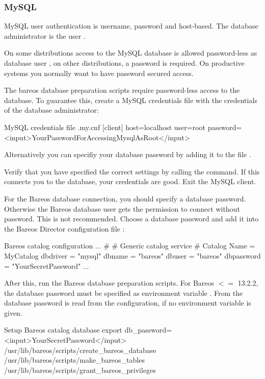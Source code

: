 \subsubsection{MySQL}
    \label{catalog-maintenance-mysql}

MySQL user authentication is username, password and host-based.
The database administrator is the user .

On some distributions access to the MySQL database is allowed password-less as database user ,
on other distributions, a password is required.
On productive systems you normally want to have password secured access.

The bareos database preparation scripts require password-less access to the database.
To guarantee this, create a MySQL credentials file  with the credentials of the database administrator:
\begin{config}{MySQL credentials file .my.cnf}
[client]
host=localhost
user=root
password=<input>YourPasswordForAccessingMysqlAsRoot</input>
\end{config}
Alternatively you can specifiy your database password by adding it to the file .

Verify that you have specified the correct settings by calling the  command.
If this connects you to the database, your credentials are good.
Exit the MySQL client.

For the Bareos database connection, you should specify a database password. 
Otherwise the Bareos database user gets the permission to connect without password.
This is not recommended.
Choose a database password and add it into the Bareos Director configuration file \configFileDirUnix:
\begin{bconfig}{Bareos catalog configuration}
...
#
# Generic catalog service
#
Catalog {
  Name = MyCatalog
  dbdriver = "mysql"
  dbname = "bareos"
  dbuser = "bareos"
  dbpassword = "YourSecretPassword"
}
...
\end{bconfig}

After this, run the Bareos database preparation scripts.
For Bareos $<=$ 13.2.2, the database password must be specified as environment variable .
From 
the database password is read from the configuration, if no environment variable is given.

\begin{commands}{Setup Bareos catalog database}
export db_password=<input>YourSecretPassword</input>
/usr/lib/bareos/scripts/create_bareos_database
/usr/lib/bareos/scripts/make_bareos_tables
/usr/lib/bareos/scripts/grant_bareos_privileges
\end{commands}


